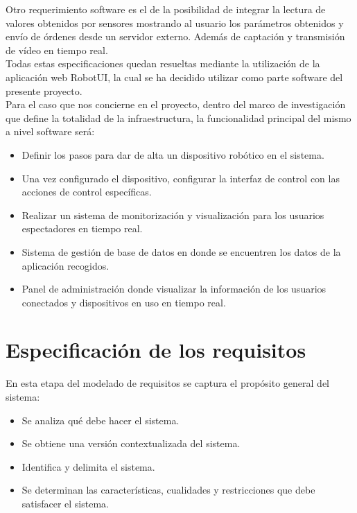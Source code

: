 Otro requerimiento software es el de la posibilidad de integrar la lectura de valores obtenidos por sensores mostrando al usuario los parámetros obtenidos y envío de órdenes
desde un servidor externo. Además de captación y transmisión de vídeo en tiempo real.\\

Todas estas especificaciones quedan resueltas mediante la utilización de la aplicación web RobotUI, la cual se ha decidido utilizar como parte software del presente proyecto.\\

Para el caso que nos concierne en el proyecto, dentro del marco de investigación que define la totalidad de la infraestructura, la funcionalidad principal del mismo a nivel 
software será:\\

\begin{itemize}
\item Definir los pasos para dar de alta un dispositivo robótico en el sistema.
\item Una vez configurado el dispositivo, configurar la interfaz de control con las acciones de control específicas.
\item Realizar un sistema de monitorización y visualización para los usuarios espectadores en tiempo real.
\item Sistema de gestión de base de datos en donde se encuentren los datos de la aplicación recogidos.
\item Panel de administración donde visualizar la información de los usuarios conectados y dispositivos en uso en tiempo real.
\end{itemize}

\section[Especificación]{Especificación de los requisitos}

En esta etapa del modelado de requisitos se captura el propósito general del sistema:

\begin{itemize}
\item Se analiza qué debe hacer el sistema.
\item Se obtiene una versión contextualizada del sistema.
\item Identifica y delimita el sistema.
\item Se determinan las características, cualidades y restricciones que debe satisfacer el sistema.
\end{itemize}

